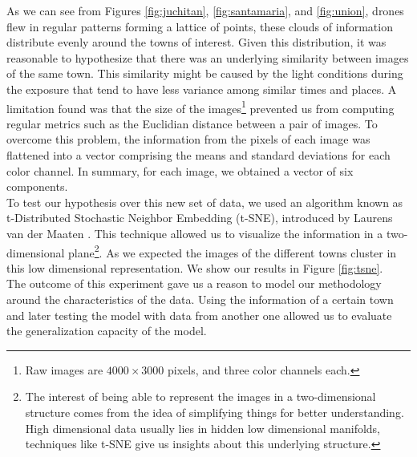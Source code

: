 As we can see from Figures \ref{fig:juchitan}, \ref{fig:santamaria}, and \ref{fig:union}, drones flew in regular patterns forming a lattice of points, these clouds of information distribute evenly around the towns of interest. Given this distribution, it was reasonable to hypothesize that there was an underlying similarity between images of the same town. This similarity might be caused by the light conditions during the exposure that tend to have less variance among similar times and places. A limitation found was that the size of the images\footnote{Raw images are $4000\times3000$ pixels, and three color channels each.} prevented us from computing regular metrics such as the Euclidian distance between a pair of images. To overcome this problem, the information from the pixels of each image was flattened into a vector comprising the means and standard deviations for each color channel. In summary, for each image, we obtained a vector of six components.\\

To test our hypothesis over this new set of data, we used an algorithm known as t-Distributed Stochastic Neighbor Embedding (t-SNE), introduced by Laurens van der Maaten \cite{t-sne}. This technique allowed us to visualize the information in a two-dimensional plane\footnote{The interest of being able to represent the images in a two-dimensional structure comes from the idea of simplifying things for better understanding. High dimensional data usually lies in hidden low dimensional manifolds, techniques like t-SNE give us insights about this underlying structure.}. As we expected the images of the different towns cluster in this low dimensional representation. We show our results in Figure \ref{fig:tsne}.\\

The outcome of this experiment gave us a reason to model our methodology around the characteristics of the data. Using the information of a certain town and later testing the model with data from another one allowed us to evaluate the generalization capacity of the model.\\


